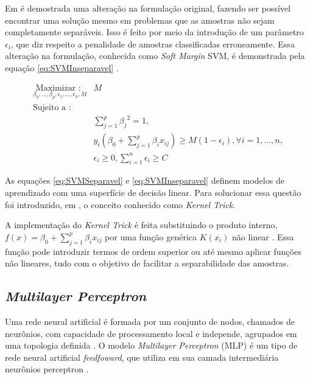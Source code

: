 Em  é demostrada uma alteração na formulação original, fazendo ser possível encontrar uma solução mesmo em problemas que as amostras não sejam completamente separáveis. Isso é feito por meio da introdução de um parâmetro $\epsilon_i$, que diz respeito a penalidade de amostras classificadas erroneamente. Essa alteração na formulação, conhecida como \textit{Soft Margin} SVM, é demonstrada pela equação \ref{eq:SVMInseparavel} \cite{James20131}.

\begin{equation}
\begin{split}
\underset {\beta_0, ..., \beta_p, \epsilon_1, ..., \epsilon_n, M}  {\text{Maximizar : }} &{M} \\
\text{Sujeito a : } \\
&\sum_{j=1}^{p}{{\beta_j}^2} = 1, \\
&y_i(\beta_0 + \sum_{j=1}^{p}{{\beta_i x_{ij}}}) \geq M(1 - \epsilon_i), \forall i = 1, ..., n, \\
&\epsilon_i \geq 0,  \sum_{i=1}^{n}{\epsilon_i} \geq C
\end{split}
\label{eq:SVMInseparavel}
\end{equation}

As equações \ref{eq:SVMSeparavel} e \ref{eq:SVMInseparavel} definem modelos de aprendizado com uma superfície de decisão linear. Para solucionar essa questão foi introduzido, em  , o conceito conhecido como \textit{Kernel Trick}.

A implementação do \textit{Kernel Trick} é feita substituindo o produto interno, $f(x) = \beta_0 + \sum_{j=1}^{p}{{\beta_i x_{ij}}}$ por uma função genérica $K(x_i)$ não linear \cite{James20131}. Essa função pode introduzir termos de ordem superior ou até mesmo aplicar funções não lineares, tudo com o objetivo de facilitar a separabilidade das amostras. 
	
\subsection{\textit{Multilayer Perceptron}}
\label{sssec:MLPClassificationSubSection}
Uma rede neural artificial é formada por um conjunto de nodos, chamados de neurônios, com capacidade de processamento local e independe, agrupados em uma topologia definida \cite{Braga2007}.  O modelo \textit{Multilayer Perceptron} (MLP) é um tipo de rede neural artificial \textit{feedfoward}, que utiliza em sua camada intermediária neurônios perceptron \cite{AbadiABBCCCDDDG16}. 

